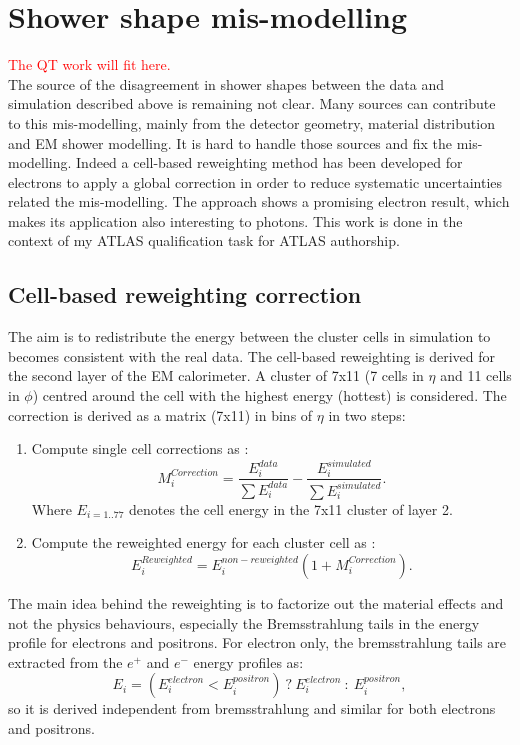 \section{Shower shape mis-modelling}
\label{gamma:ss}
\textcolor{red}{The QT work will fit here. \\} 
The source of the disagreement in shower shapes between the data and simulation described above is remaining not clear. Many sources can contribute to this mis-modelling, mainly from the detector geometry, material distribution and EM shower modelling. It is hard to handle those sources and fix the mis-modelling. Indeed a cell-based reweighting method has been developed for electrons to apply a global correction in order to reduce systematic uncertainties related the mis-modelling. The approach shows a promising electron result, which makes its application also interesting to photons. This work is done in the context of my ATLAS qualification task for ATLAS authorship.
\subsection{Cell-based reweighting correction}
\label{gamma:ss:reweighting}
The aim is to redistribute the energy between the cluster cells in simulation to becomes consistent with the real data. The cell-based reweighting is derived for the second layer of the EM calorimeter. A cluster of 7x11 (7 cells in $\eta$ and 11 cells in $\phi$) centred around the cell with the highest energy (hottest) is considered. The correction is derived as a matrix (7x11) in bins of $\eta$ in two steps:
\begin{enumerate}
    \item Compute single cell corrections as : 
    \begin{equation}
        M_{i}^{Correction} = \frac{E_{i}^{data}}{\sum E_{i}^{data}} -  \frac{E_{i}^{simulated}}{\sum E_{i}^{simulated}}.
    \end{equation}
    Where $ E_{i = 1.. 77}$ denotes the cell energy in the 7x11 cluster of layer 2. 
    \item Compute the reweighted energy for each cluster cell as : 
    \begin{equation}
        E_{i}^{Reweighted} = E_{i}^{non-reweighted}(1+M_{i}^{Correction}).
    \end{equation}
\end{enumerate}
The main idea behind the reweighting is to factorize out the material effects and not the physics behaviours, especially the Bremsstrahlung tails in the energy profile for electrons and positrons. For electron only, the bremsstrahlung tails are extracted from the $e^+$ and $e^-$ energy profiles as: 
\begin{equation}
    E_{i} = (E_{i}^{electron} <  E_{i}^{positron}) \ ? \ E_{i}^{electron} \ : \  E_{i}^{positron},
\end{equation}
so it is derived independent from bremsstrahlung and similar for both electrons and positrons.
